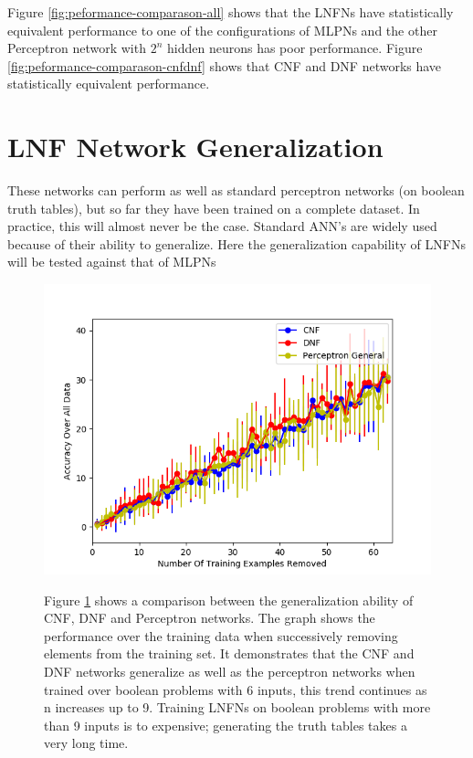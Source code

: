 Figure \ref{fig:peformance-comparason-all} shows that the LNFNs have statistically equivalent performance to one of the configurations of MLPNs and the other Perceptron network with $2^n$ hidden neurons has poor performance. Figure \ref{fig:peformance-comparason-cnfdnf} shows that CNF and DNF networks have statistically equivalent performance. 

\section{LNF Network Generalization} \label{sec:lnfn-generalization}
These networks can perform as well as standard perceptron networks (on boolean truth tables), but so far they have been trained on a complete dataset. In practice, this will almost never be the case. Standard ANN's are widely used because of their ability to generalize. Here the generalization capability of LNFNs will be tested against that of MLPNs

\begin{figure}[H]
	\centering
	\begin{minipage}[t]{0.6\textwidth}
		\vspace{0px}
		\includegraphics[width=\textwidth]{6-generalization.png}
		\caption{}
		\label{fig:generalization-peformance-6}
	\end{minipage}
	\begin{minipage}[t]{0.39\textwidth}
	\vspace{0px}
		Figure \ref{fig:generalization-peformance-6} shows a comparison between the generalization ability of CNF, DNF and Perceptron networks. The graph shows the performance over the training data when successively removing elements from the training set. It demonstrates that the CNF and DNF networks generalize as well as the perceptron networks when trained over boolean problems with 6 inputs, this trend continues as n increases up to 9. Training LNFNs on boolean problems with more than 9 inputs is to expensive; generating the truth tables takes a very long time.
	\end{minipage}
	\hfill
\end{figure}

